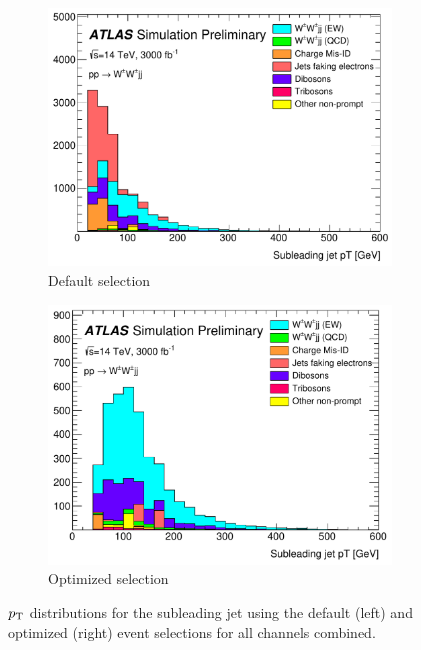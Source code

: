 \begin{figure}[htbp]
  \centering
  \begin{subfigure}[b]{.48\textwidth}
    \includegraphics[width=\textwidth]{figs/ssww_upgrade/distributions/default/all_pass9_jet1_pt-cropped}
    \caption{Default selection}
    \label{fig:sswwupgrade_jet1pt_compare_d}
  \end{subfigure}
  \begin{subfigure}[b]{.475\textwidth}
  \includegraphics[width=\textwidth]{figs/ssww_upgrade/distributions/optimized/all_pass9_jet1_pt-cropped}
    \caption{Optimized selection}
    \label{fig:sswwupgrade_jet1pt_compare_o}
  \end{subfigure}
  \caption{$p_{\mathrm{T}}$ distributions for the subleading jet using the default (left) and optimized (right) event selections for all channels combined.}
  \label{fig:sswwupgrade_jet1pt_compare}
\end{figure}


